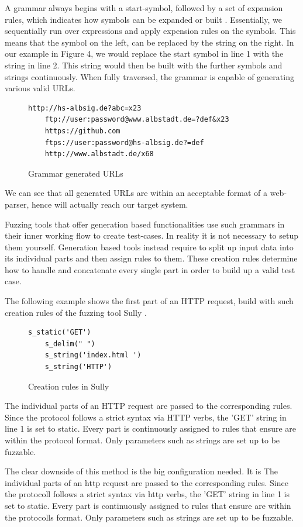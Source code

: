 \documentclass[journal=tosc,final]{iacrtrans}
\begin{document}
A grammar always begins with a start-symbol, followed by a set of expansion rules, which indicates how symbols can be expanded or built \cite{fuzz}. 
Essentially, we sequentially run over expressions and apply expension rules on the symbols. This means that the symbol on the left, can be replaced by the string on the right. In our example in Figure 4, we would replace the start symbol in line 1 with the string in line 2. This string would then be built with the further symbols and strings continuously. When fully traversed, the grammar is capable of generating various valid URLs.
\begin{figure}[h]
 \caption{Grammar generated URLs}
 \begin{lstlisting}[style=code]
	http://hs-albsig.de?abc=x23
	ftp://user:password@www.albstadt.de=?def&x23
	https://github.com
	ftps://user:password@hs-albsig.de?=def
	http://www.albstadt.de/x68
 \end{lstlisting} 
\end{figure}
\newpage
We can see that all generated URLs are within an acceptable format of a web-parser, hence will actually reach our target system.

Fuzzing tools that offer generation based functionalities use such grammars in their inner working flow to create test-cases. In reality it is not necessary to setup them yourself. Generation based tools instead require to split up input data into its individual parts and then assign rules to them. These creation rules determine how to handle and concatenate every single part in order to build up a valid test case. 

The following example shows the first part of an HTTP request, build with such creation rules of the fuzzing tool Sully \cite{sully}.
\begin{figure}[h]
 \caption{Creation rules in Sully}
 \begin{lstlisting}[style=code]
	s_static('GET')
	s_delim(" ")
	s_string('index.html ')
	s_string('HTTP')
 \end{lstlisting}
\end{figure}

The individual parts of an HTTP request are passed to the corresponding rules. Since the protocol follows a strict syntax via HTTP verbs, the 'GET' string in line 1 is set to static. Every part is continuously assigned to rules that ensure are within the protocol format. Only parameters such as strings are set up to be fuzzable.
   
The clear downside of this method is the big configuration needed. It is The individual parts of an http request are passed to the corresponding rules. Since the protocoll follows a strict syntax via http verbs, the 'GET' string in line 1 is set to static. Every part is continuously assigned to rules that ensure are within the protocolls format. Only parameters such as strings are set up to be fuzzable.
   
\end{document}
